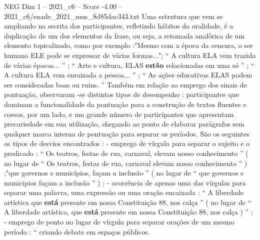 \begin{textsample}{NEG Dim 1 – 2021\_c6 – Score -4.00 – 2021\_c6/enade\_2021\_mus\_8d85dac343.txt}
Uma estrutura que vem se ampliando na escrita dos participantes, refletindo hábitos da oralidade, é a duplicação de um dos elementos da frase, ou seja, a retomada anafórica de um elemento topicalizado, como por exemplo :"Mesmo com a época da censura, o ser humano ELE pode se expressar de várias formas..."; “ A cultura ELA vem trazida de várias épocas... ” ; “ Arte e cultura, ELAS \textbf{estão} relacionadas em uma só ” ; “ A cultura ELA vem enraizada a pessoa... ” ; “ As ações educativas ELAS podem ser consideradas boas ou ruins. ” Também em relação ao emprego dos sinais de pontuação, observaram -se distintos tipos de desempenho : participantes que dominam a funcionalidade da pontuação para a construção de textos fluentes e coesos, por um lado, e um grande número de participantes que apresentam precariedade em sua utilização, chegando ao ponto de elaborar parágrafos sem qualquer marca interna de pontuação para separar os períodos.
São os seguintes os tipos de desvios encontrados : - emprego de vírgula para separar o sujeito e o predicado : “ Os teatros, festas de rua, carnaval, elevam nosso conhecimento ” ( no lugar de “ Os teatros, festas de rua, carnaval elevam nosso conhecimento ” ) ;"que governos e municípios, façam a inclusão ” ( no lugar de “ que governos e municipios façam a inclusão ” ) ; - ocorrência de apenas uma das vírgulas para separar uma palavra, uma expressão ou uma oração encaixada : “ A liberdade artística que \textbf{está} presente em nossa Constituição 88, nos calça ” ( no lugar de “ A liberdade artística, que \textbf{está} presente em nossa Constituição 88, nos calça ) ” ; - emprego de ponto no lugar de vírgula para separar orações de um mesmo período : “ criando debate em espaços públicos.

\end{textsample}
